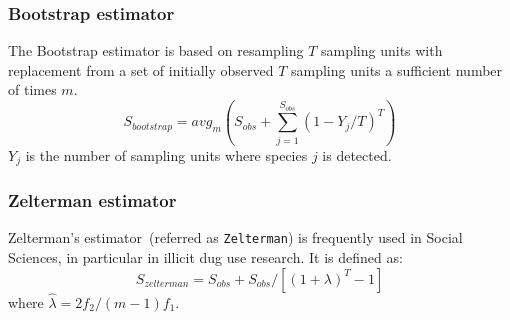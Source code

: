 \documentclass[sigconf,review,anonymous]{acmart}
\newcommand{\Zelterman}{Zelterman\xspace}
\newcommand{\Bootstrap}{Bootstrap\xspace}
\newcounter{todocounter}
\newcommand{\todo}[1]{\marginpar{$|$}\textcolor{red}{\stepcounter{todocounter}\footnote[\thetodocounter]{\textcolor{red}{\textbf{TODO }}\textit{#1}}}}
\def\<#1>{\texttt{#1}}
\renewcommand{\todo}[1]{}
\begin{document}
\subsubsection{Bootstrap estimator~\cite{smith1984nonparametric}} %
The \Bootstrap estimator
is based on resampling $T$ sampling units with replacement from a set of
initially observed $T$ sampling units a sufficient number of times $m$.
\begin{displaymath}
S_{bootstrap}  = {avg}_{m}( S_{obs} + \sum^{S_{obs}}_{j=1} (1 - Y_j/T)^T)
\end{displaymath}
$Y_{j}$ is the number of sampling units %
where species $j$ is detected. %


\subsubsection{\Zelterman estimator~\cite{bohning2010some}}
Zelterman's estimator~(referred as \<Zelterman>) is frequently used in Social Sciences, in particular in illicit dug use research.
It is defined as:
\begin{displaymath}
    S_{zelterman} = S_{obs} + S_{obs}/[(1+\lambda)^T - 1]
\end{displaymath}
where $\hat{\lambda} = 2f_2/(m-1)f_1$.

\end{document}
